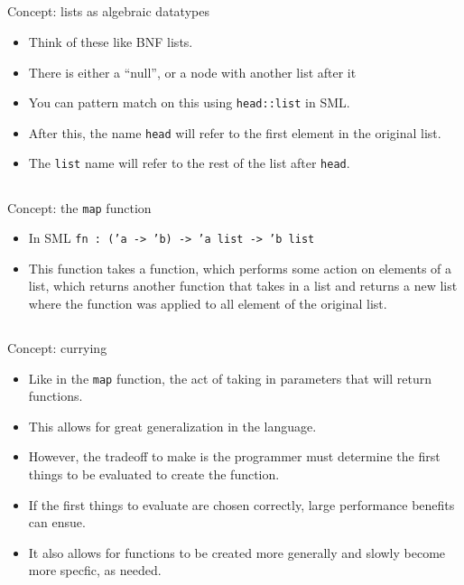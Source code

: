 \subsection{}
Concept: lists as algebraic datatypes

\begin{itemize}[noitemsep]
\item Think of these like BNF lists.
\item There is either a ``null'', or a node with another list after it
\item You can pattern match on this using \texttt{head::list} in SML.
\item After this, the name \texttt{head} will refer to the first element in the original list.
\item The \texttt{list} name will refer to the rest of the list after \texttt{head}.
\end{itemize}

\subsection{}
Concept: the \texttt{map} function

\begin{itemize}[noitemsep]
\item In SML \texttt{fn : ('a -> 'b) -> 'a list -> 'b list}
\item This function takes a function, which performs some action on elements of a list, which returns another function that takes in a list and returns a new list where the function was applied to all element of the original list.
\end{itemize}

\subsection{}
Concept: currying

\begin{itemize}[noitemsep]
\item Like in the \texttt{map} function, the act of taking in parameters that will return functions.
\item This allows for great generalization in the language.
\item However, the tradeoff to make is the programmer must determine the first things to be evaluated to create the function.
\item If the first things to evaluate are chosen correctly, large performance benefits can ensue.
\item It also allows for functions to be created more generally and slowly become more specfic, as needed.
\end{itemize}

